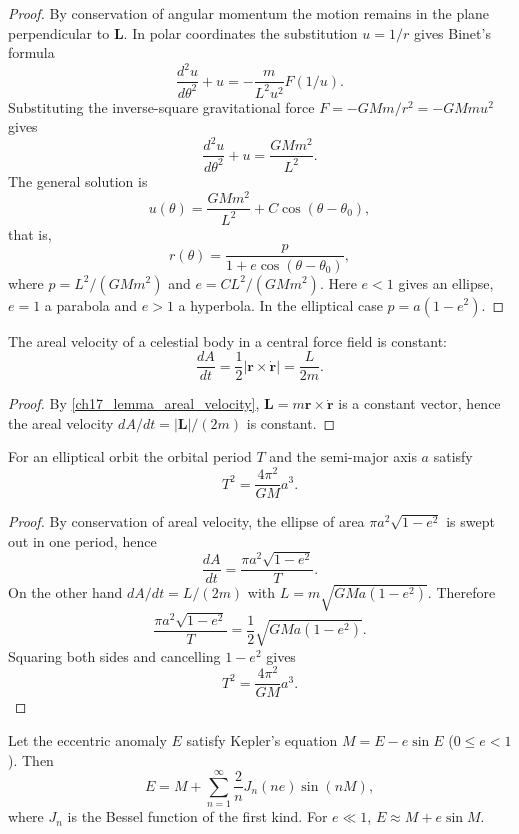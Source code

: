 \begin{proof}
By conservation of angular momentum the motion remains in the plane perpendicular to \(\mathbf L\). In polar coordinates the substitution \(u=1/r\) gives Binet's formula
\[
\frac{d^2u}{d\theta^2}+u=-\frac{m}{L^2u^2}F(1/u).
\]
Substituting the inverse-square gravitational force \(F=-GMm/r^2=-GMm u^2\) gives
\[
\frac{d^2u}{d\theta^2}+u=\frac{GMm^2}{L^2}.
\]
The general solution is
\[
u(\theta)=\frac{GMm^2}{L^2}+C\cos(\theta-\theta_0),
\]
that is,
\[
r(\theta)=\frac{p}{1+e\cos(\theta-\theta_0)},
\]
where \(p=L^2/(GMm^2)\) and \(e=CL^2/(GMm^2)\). Here \(e<1\) gives an ellipse, \(e=1\) a parabola and \(e>1\) a hyperbola. In the elliptical case \(p=a(1-e^2)\).
\end{proof}

\begin{theorem}\label{thm:kepler_second}
The areal velocity of a celestial body in a central force field is constant:
\[
\frac{dA}{dt}=\frac12|\mathbf r\times\dot{\mathbf r}|=\frac{L}{2m}.
\]
\end{theorem}

\begin{proof}
By \cref{ch17_lemma_areal_velocity}, \(\mathbf L=m\mathbf r\times\dot{\mathbf r}\) is a constant vector, hence the areal velocity \(dA/dt=|\mathbf L|/(2m)\) is constant.
\end{proof}

\begin{theorem}\label{thm:kepler_third}
For an elliptical orbit the orbital period \(T\) and the semi-major axis \(a\) satisfy
\[
T^2=\frac{4\pi^2}{GM}a^3.
\]
\end{theorem}

\begin{proof}
By conservation of areal velocity, the ellipse of area \(\pi a^2\sqrt{1-e^2}\) is swept out in one period, hence
\[
\frac{dA}{dt}=\frac{\pi a^2\sqrt{1-e^2}}{T}.
\]
On the other hand \(dA/dt=L/(2m)\) with \(L=m\sqrt{GMa(1-e^2)}\). Therefore
\[
\frac{\pi a^2\sqrt{1-e^2}}{T}=\frac12\sqrt{GMa(1-e^2)}.
\]
Squaring both sides and cancelling \(1-e^2\) gives
\[
T^2=\frac{4\pi^2}{GM}a^3.
\]
\end{proof}

\begin{lemma}\label{lem:kepler_equation_solution}
Let the eccentric anomaly \(E\) satisfy Kepler's equation \(M=E-e\sin E\) (\(0\le e<1\)). Then
\[
E=M+\sum_{n=1}^{\infty}\frac2nJ_n(ne)\sin(nM),
\]
where \(J_n\) is the Bessel function of the first kind. For \(e\ll1\), \(E\approx M+e\sin M\).
\end{lemma}

